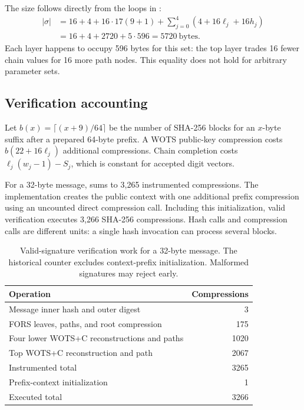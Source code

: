 \documentclass[a4paper,envcountsame,runningheads]{llncs}
\begin{document}
The size follows directly from the loops in :
\begin{align}\label{eq:size}
 |\sigma|&=16+4+16\cdot17(9+1)
      +\sum_{j=0}^{4}(4+16\ell_j+16h_j)\nonumber\\
 &=16+4+2720+5\cdot596=5720\ \mathrm{bytes}.
\end{align}
Each layer happens to occupy 596 bytes for this set: the top layer trades 16 fewer chain values for 16 more path nodes. This equality does not hold for arbitrary parameter sets.

\subsection{Verification accounting}
Let $b(x)=\lceil(x+9)/64\rceil$ be the number of SHA-256 blocks for an $x$-byte suffix after a prepared 64-byte prefix. A WOTS public-key compression costs $b(22+16\ell_j)$ additional compressions. Chain completion costs $\ell_j(w_j-1)-S_j$, which is constant for accepted digit vectors.

For a 32-byte message,  sums to 3,265 instrumented compressions. The implementation creates the public context with one additional prefix compression using an uncounted direct compression call. Including this initialization, valid verification executes 3,266 SHA-256 compressions. Hash calls and compression calls are different units: a single hash invocation can process several blocks.

\begin{table}[t]
\caption{Valid-signature verification work for a 32-byte message. The historical counter excludes context-prefix initialization. Malformed signatures may reject early.}\label{tab:work}
\centering\small
\begin{tabular}{P{61mm}r}\toprule
Operation & Compressions\\\midrule
Message inner hash and outer digest &3\\
FORS leaves, paths, and root compression &175\\
Four lower WOTS+C reconstructions and paths &1020\\
Top WOTS+C reconstruction and path &2067\\\midrule
Instrumented total &3265\\
Prefix-context initialization &1\\\midrule
Executed total &3266\\\bottomrule
\end{tabular}
\end{table}
\end{document}
